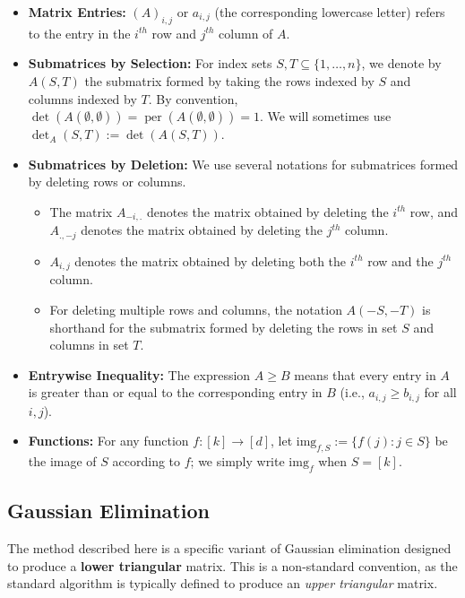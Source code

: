 \documentclass[11pt]{article}
\theoremstyle{definition}
\DeclareMathOperator{\per}{per}
\begin{document}
\begin{itemize}
	\item \textbf{Matrix Entries:} $(A)_{i,j}$ or $a_{i,j}$ (the corresponding lowercase letter) refers to the entry in the $i^{th}$ row and $j^{th}$ column of $A$.
	
	\item \textbf{Submatrices by Selection:} For index sets $S, T \subseteq \{1, \dots, n\}$, we denote by $A(S, T)$ the submatrix formed by taking the rows indexed by $S$ and columns indexed by $T$. By convention, $\det(A(\emptyset, \emptyset)) = \per(A(\emptyset, \emptyset)) = 1$. We will sometimes use $\det_A(S, T) := \det(A(S, T))$. 
	
\item \textbf{Submatrices by Deletion:} We use several notations for submatrices formed by deleting rows or columns.
\begin{itemize}
	\item The matrix $A_{-i,.}$ denotes the matrix obtained by deleting the $i^{th}$ row, and $A_{.,-j}$ denotes the matrix obtained by deleting the $j^{th}$ column.
	\item $A_{i,j}$ denotes the matrix obtained by deleting both the $i^{th}$ row and the $j^{th}$ column.
	\item For deleting multiple rows and columns, the notation $A(-S, -T)$ is shorthand for the submatrix formed by deleting the rows in set $S$ and columns in set $T$.
\end{itemize}
	
	
	\item \textbf{Entrywise Inequality:} The expression $A \ge B$ means that every entry in $A$ is greater than or equal to the corresponding entry in $B$ (i.e., $a_{i,j} \ge b_{i,j}$ for all $i,j$).
	
	\item \textbf{Functions:} For any function $f:[k]\rightarrow [d]$, let $\text{img}_{f,S}:= \{f(j): j\in S\}$ be the image of $S$ according to $f$; we simply write $\text{img}_{f}$ when $S=[k]$.
\end{itemize}


\subsection{Gaussian Elimination}

\begin{remark}
	The method described here is a specific variant of Gaussian elimination designed to produce a \textbf{lower triangular} matrix. This is a non-standard convention, as the standard algorithm is typically defined to produce an \textit{upper triangular} matrix.
\end{remark}
\end{document}
